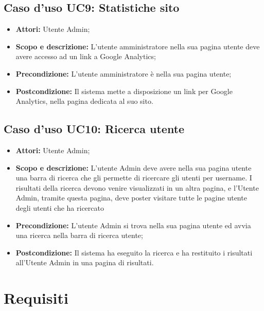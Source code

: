 \documentclass[12pt,a4paper,titlepage]{article}
\begin{document}
		\subsection{Caso d'uso UC9: Statistiche sito}
	\label{UC9}
	\begin{itemize}
		\item \textbf{Attori: }Utente Admin;
		\item \textbf{Scopo e descrizione: }L'utente amministratore nella sua pagina utente deve avere accesso ad un link a Google Analytics;
		\item \textbf{Precondizione: }L'utente amministratore è nella sua pagina utente;
		\item \textbf{Postcondizione: }Il sistema mette a disposizione un link per Google Analytics, nella pagina dedicata al suo sito.
	\end{itemize}
	\subsection{Caso d'uso UC10: Ricerca utente}
	\label{UC10}
	\begin{itemize}
		\item \textbf{Attori: }Utente Admin;
		\item \textbf{Scopo e descrizione: }L'utente Admin deve avere nella sua pagina utente una barra di ricerca che gli permette di ricercare gli utenti per username. I risultati della ricerca devono venire visualizzati in un altra pagina, e l'Utente Admin, tramite questa pagina, deve poster visitare tutte le pagine utente degli utenti che ha ricercato
		\item \textbf{Precondizione: }L'utente Admin si trova nella sua pagina utente ed avvia una ricerca nella barra di ricerca utente;
		\item \textbf{Postcondizione: }Il sistema ha eseguito la ricerca e ha restituito i risultati all'Utente Admin in una pagina di risultati.
	\end{itemize}
	
	\newpage
	\section{Requisiti}
\end{document}
